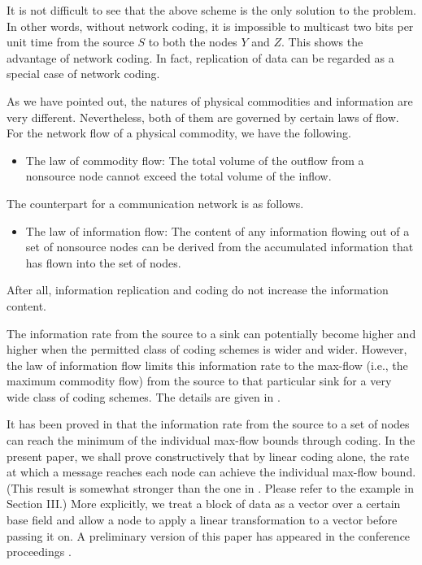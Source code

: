 \documentclass[journal]{IEEEtran}
\begin{document}
\par
It is not difficult to see that the above scheme is the only solution to the problem. In other words, without network coding, it is impossible to multicast two bits per unit time from the source $S$ to both the nodes $Y$ and $Z$. This shows the advantage of network coding. In fact, replication of data can be regarded as a special case of network coding.
\par
As we have pointed out, the natures of physical commodities and information are very different. Nevertheless, both of them are governed by certain laws of flow. For the network flow of a physical commodity, we have the following.
\begin{itemize}
	\item The law of commodity flow: The total volume of the outflow from a nonsource node cannot exceed the total volume of the inflow.
\end{itemize}
The counterpart for a communication network is as follows.
\begin{itemize}
	\item The law of information flow: The content of any information flowing out of a set of nonsource nodes can be derived from the accumulated information that has flown into the set of nodes.
\end{itemize}
After all, information replication and coding do not increase the information content.
\par
The information rate from the source to a sink can potentially become higher and higher when the permitted class of coding schemes is wider and wider. However, the law of information flow limits this information rate to the max-flow (i.e., the maximum commodity flow) from the source to that particular sink for a very wide class of coding schemes. The details are given in \cite{RNSNetwork}.
\par
It has been proved in \cite{RNSNetwork} that the information rate from the source to a set of nodes can reach the minimum of the individual max-flow bounds through coding. In the present paper, we shall prove constructively that by linear coding alone, the rate at which a message reaches each node can achieve the individual max-flow bound. (This result is somewhat stronger than the one in \cite{RNSNetwork}. Please refer to the example in Section III.) More explicitly, we treat a block of data as a vector over a certain base field and allow a node to apply a linear transformation to a vector before passing it on. A preliminary version of this paper has appeared in the conference proceedings \cite{Li1998Network}.
\end{document}
